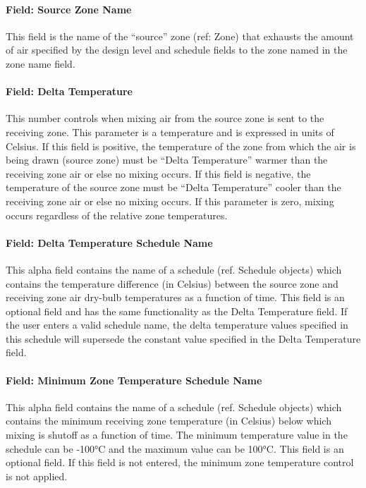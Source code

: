 \paragraph{Field: Source Zone Name}\label{field-source-zone-name}

This field is the name of the ``source'' zone (ref: Zone) that exhausts the amount of air specified by the design level and schedule fields to the zone named in the zone name field.

\paragraph{Field: Delta Temperature}\label{field-delta-temperature-2}

This number controls when mixing air from the source zone is sent to the receiving zone. This parameter is a temperature and is expressed in units of Celsius. If this field is positive, the temperature of the zone from which the air is being drawn (source zone) must be ``Delta Temperature'' warmer than the receiving zone air or else no mixing occurs. If this field is negative, the temperature of the source zone must be ``Delta Temperature'' cooler than the receiving zone air or else no mixing occurs. If this parameter is zero, mixing occurs regardless of the relative zone temperatures.

\paragraph{Field: Delta Temperature Schedule Name}\label{field-delta-temperature-schedule-name-2}

This alpha field contains the name of a schedule (ref. Schedule objects) which contains the temperature difference (in Celsius) between the source zone and receiving zone air dry-bulb temperatures as a function of time. This field is an optional field and has the same functionality as the Delta Temperature field. If the user enters a valid schedule name, the delta temperature values specified in this schedule will supersede the constant value specified in the Delta Temperature field.

\paragraph{Field: Minimum Zone Temperature Schedule Name}\label{field-minimum-zone-temperature-schedule-name}

This alpha field contains the name of a schedule (ref. Schedule objects) which contains the minimum receiving zone temperature (in Celsius) below which mixing is shutoff as a function of time. The minimum temperature value in the schedule can be -100°C and the maximum value can be 100°C. This field is an optional field. If this field is not entered, the minimum zone temperature control is not applied.

